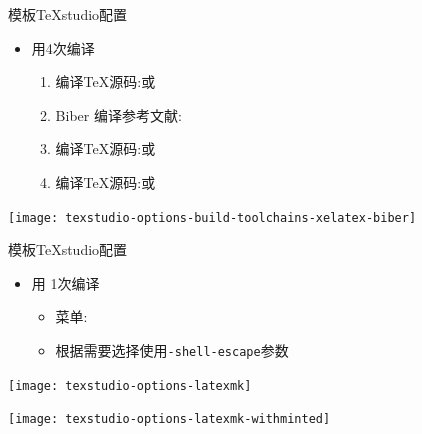 \documentclass[xcolor=svgnames, t, aspectratio=169]{ctexbeamer}
\begin{document}
\begin{frame}{\nwafuthesis 模板}{TeXstudio配置}
  \stretchon
  \begin{itemize}
  \item 用\XeLaTeX \alert{4次}编译
    \begin{enumerate}
    \item \XeLaTeX 编译\TeX 源码:或
    \item Biber 编译参考文献:
    \item \XeLaTeX 编译\TeX 源码:或 
    \item \XeLaTeX 编译\TeX 源码:或
    \end{enumerate}
  \end{itemize}
  \centering
  \begin{annotatedFigure}
    {\texttt{[image: texstudio-options-build-toolchains-xelatex-biber]}}
  \end{annotatedFigure}
  \stretchoff
\end{frame}

\begin{frame}{\nwafuthesis 模板}{TeXstudio配置}
  \stretchon
  \begin{itemize}
  \item 用 \alert{1次}编译
    \begin{itemize}
    \item 菜单:
    \item 根据需要选择使用\texttt{-shell-escape}参数
    \end{itemize}
  \end{itemize}
  \centering
  \begin{annotatedFigure}
    {\texttt{[image: texstudio-options-latexmk]}}
  \end{annotatedFigure}
  \begin{annotatedFigure}
    {\texttt{[image: texstudio-options-latexmk-withminted]}}
  \end{annotatedFigure}  
  \stretchoff
\end{frame}
\end{document}
